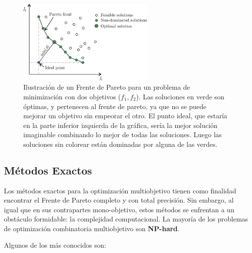 \documentclass[12pt,a4paper]{book}
\begin{document}
\begin{figure}[H]
    \centering
    \includegraphics[width=0.6\textwidth]{images/pareto_front.png}
    \caption{Ilustración de un Frente de Pareto para un problema de minimización con dos objetivos ($f_1, f_2$). Las soluciones en verde son óptimas, y pertenecen al frente de pareto, ya que no se puede mejorar un objetivo sin empeorar el otro. El punto ideal, que estaría en la parte inferior izquierda de la gráfica, sería la mejor solución imaginable combinando lo mejor de todas las soluciones. Luego las soluciones sin colorear están dominadas por alguna de las verdes\cite{Bre2017}.}
    \label{fig:pareto}
\end{figure}

\subsection{Métodos Exactos}

Los métodos exactos para la optimización multiobjetivo tienen como finalidad encontrar el Frente de Pareto completo y con total precisión. Sin embargo, al igual que en sus contrapartes mono-objetivo, estos métodos se enfrentan a un obstáculo formidable: la complejidad computacional. La mayoría de los problemas de optimización combinatoria multiobjetivo son \textbf{NP-hard}.

Algunos de los más conocidos son:
\end{document}
